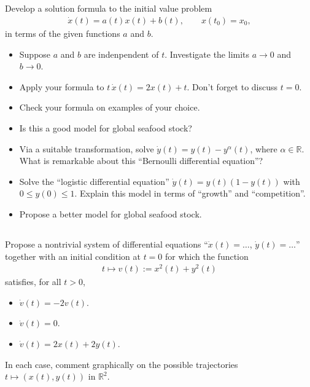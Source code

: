 \documentclass[12pt,a4paper]{article}
\begin{document}
    
    
    \subsection{}
    
    Develop a solution formula to
    the initial value problem
    \begin{align}
        \dot{x}(t) = a(t) x(t) + b(t)
        ,
        \qquad
        x(t_0) = x_0
        ,
    \end{align}
    in terms of the given functions $a$ and $b$.
    \begin{itemize}
    \item
        Suppose $a$ and $b$ are indenpendent of $t$.
        Investigate the limits $a \to 0$ and $b \to 0$.
    \item
        Apply your formula to $t \, \dot{x}(t) = 2 x(t) + t$.
        Don't forget to discuss $t = 0$.
    \item
        Check your formula on examples of your choice.
    \item
        Is this a good model for global seafood stock?
    \item
        Via a suitable transformation,
        solve 
        $\dot{y}(t) = y(t) - y^\alpha(t)$,
        where $\alpha \in \mathbb{R}$.
        What is remarkable about this 
        ``Bernoulli differential equation''?
    \item
        Solve the ``logistic differential equation''
        $\dot{y}(t) = y(t) (1 - y(t))$
        with $0 \leq y(0) \leq 1$.
        Explain this model
        in terms of ``growth'' and ``competition''.
    \item
        Propose a better model for global seafood stock.
    \end{itemize}

    
    \subsection{}
    
    Propose a nontrivial system of differential equations
    ``$\dot{x}(t) = \ldots$,
    $\dot{y}(t) = \ldots$''
    together with an initial condition at $t = 0$
    for which the function
    \begin{align}
        t \mapsto v(t) := x^2(t) + y^2(t)
    \end{align}
    satisfies, for all $t > 0$,
    \begin{itemize}
    \item
        $\dot{v}(t) = -2 v(t)$.
    \item 
        $\dot{v}(t) = 0$.
    \item
        $\dot{v}(t) = 2 x(t) + 2 y(t)$.
    \end{itemize}
    In each case, 
    comment graphically on the possible trajectories $t \mapsto (x(t), y(t))$ in $\mathbb{R}^2$.
\end{document}
